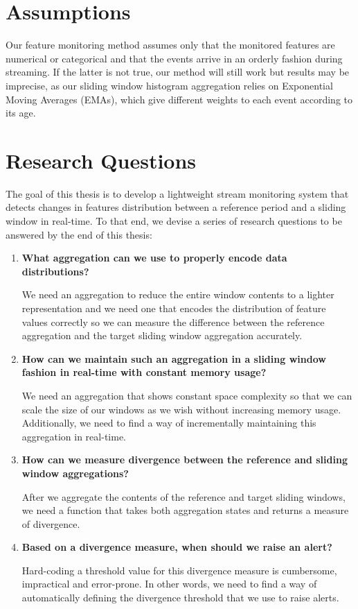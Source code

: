 \section{Assumptions} \label{sec:assumptions}
Our feature monitoring method assumes only that the monitored features are numerical or categorical and that the events arrive in an orderly fashion during streaming. If the latter is not true, our method will still work but results may be imprecise, as our sliding window histogram aggregation relies on Exponential Moving Averages (EMAs), which give different weights to each event according to its age.

\section{Research Questions} \label{sec:rqs}
The goal of this thesis is to develop a lightweight stream monitoring system that detects changes in features distribution between a reference period and a sliding window in real-time. To that end, we devise a series of research questions to be answered by the end of this thesis:

\begin{enumerate}[leftmargin=1.6cm, label=\textbf{(RQ\arabic*)}]
    \item \textbf{What aggregation can we use to properly encode data distributions?}
    
    We need an aggregation to reduce the entire window contents to a lighter representation and we need one that encodes the distribution of feature values correctly so we can measure the difference between the reference aggregation and the target sliding window aggregation accurately.
    
    \item \textbf{How can we maintain such an aggregation in a sliding window fashion in real-time with constant memory usage?}
    
    We need an aggregation that shows constant space complexity so that we can scale the size of our windows as we wish without increasing memory usage. Additionally, we need to find a way of incrementally maintaining this aggregation in real-time.
    
    
    \item \textbf{How can we measure divergence between the reference and sliding window aggregations?}
    
    After we aggregate the contents of the reference and target sliding windows, we need a function that takes both aggregation states and returns a measure of divergence.
    
    \item \textbf{Based on a divergence measure, when should we raise an alert?}
    
    Hard-coding a threshold value for this divergence measure is cumbersome, impractical and error-prone. In other words, we need to find a way of automatically defining the divergence threshold that we use to raise alerts. 
    
\end{enumerate}


